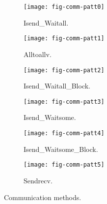 \begin{figure}[htbp]
        \centering
        \begin{subfigure}[b]{0.48\textwidth}
                \texttt{[image: fig-comm-patt0]}
                \caption{Isend\_Waitall.}
                \label{fig-comm-patt0}
        \end{subfigure}\quad
        \begin{subfigure}[b]{0.48\textwidth}
                \texttt{[image: fig-comm-patt1]}
                \caption{Alltoallv.}
                \label{fig-comm-patt1}
        \end{subfigure}

        \begin{subfigure}[b]{0.48\textwidth}
                \texttt{[image: fig-comm-patt2]}
                \caption{Isend\_Waitall\_Block.}
                \label{fig-comm-patt2}
        \end{subfigure}\quad
        \begin{subfigure}[b]{0.48\textwidth}
                \texttt{[image: fig-comm-patt3]}
                \caption{Isend\_Waitsome.}
                \label{fig-comm-patt3}
        \end{subfigure}

        \begin{subfigure}[b]{0.48\textwidth}
                \texttt{[image: fig-comm-patt4]}
                \caption{Isend\_Waitsome\_Block.}
                \label{fig-comm-patt4}
        \end{subfigure}\quad
        \begin{subfigure}[b]{0.48\textwidth}
                \texttt{[image: fig-comm-patt5]}
                \caption{Sendrecv.}
                \label{fig-comm-patt5}
        \end{subfigure}\caption{Communication methods.}\label{fig-comm-patt}
\end{figure}

